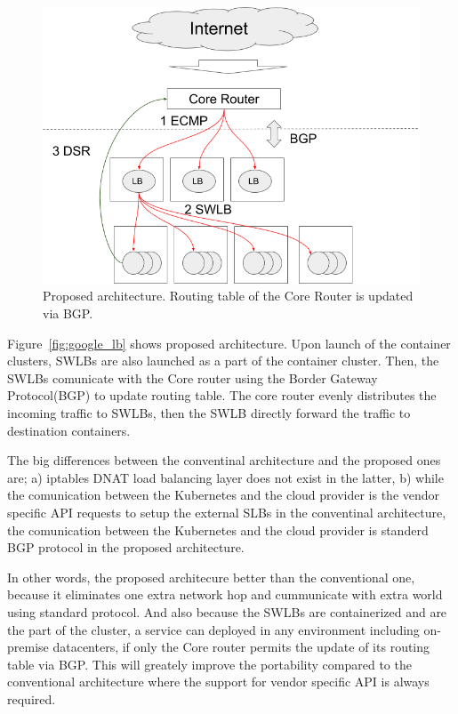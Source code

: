 \begin{figure}
\includegraphics[width=\columnwidth]{Figs/new_lb}
\caption{Proposed architecture. Routing table of the Core Router is updated via BGP.}
\label{fig:new_lb}
\end{figure}

Figure~\ref{fig:google_lb} shows proposed architecture.
Upon launch of the container clusters, SWLBs are also launched as a part of the container cluster.
Then, the SWLBs comunicate with the Core router using the Border Gateway Protocol(BGP) to update routing table.
The core router evenly distributes the incoming traffic to SWLBs, then the SWLB directly forward the traffic to destination containers.

The big differences between the conventinal architecture and the proposed ones are;
a) iptables DNAT load balancing layer does not exist in the latter,
b) while the comunication between the Kubernetes and the cloud provider is the vendor specific API requests to setup the external SLBs in the conventinal architecture, the comunication between the Kubernetes and the cloud provider is standerd BGP protocol in the proposed architecture.

In other words, the proposed architecure better than the conventional one, because it eliminates one extra network hop and cummunicate with extra world using standard protocol.
And also because the SWLBs are containerized and are the part of the cluster, a service can deployed in any environment including on-premise datacenters, if only the Core router permits the update of its routing table via BGP.
This will greately improve the portability compared to the conventional architecture where the support for vendor specific API is always required.

